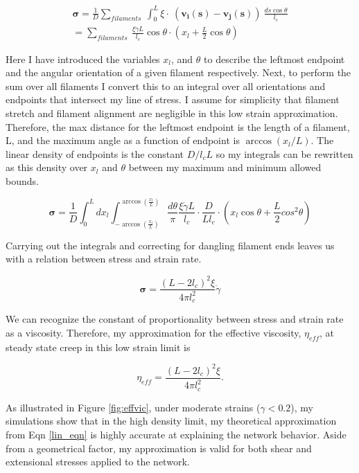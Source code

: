 \begin{multline}
\mathbf{\sigma} =  \frac{1}{D}\sum_{filaments}\:  \int_0^L \xi \cdot  \: (\mathbf{v_i(s)}-\mathbf{v_j(s)}) \:\frac{ds \cos \theta }{l_c} \\
 = \sum_{filaments}\:  \frac{\xi \dot \gamma L}{l_c} \cos \theta \cdot (x_l + \frac{L}{2} \cos \theta)
\end{multline}

Here I have introduced the variables $x_l$, and $\theta$ to describe the leftmost endpoint and the angular orientation of a given filament respectively.  Next, to perform the sum over all filaments I convert this to an integral over all orientations and endpoints that intersect my line of stress. I assume for simplicity that filament stretch and filament alignment are negligible in this low strain approximation.  Therefore, the max distance for the leftmost endpoint is the length of a filament, L, and the maximum angle as a function of endpoint is $\arccos(x_l/L)$.  The linear density of endpoints is the constant $D/l_cL$ so my integrals can be rewritten as this density over $x_l$ and $\theta$ between my maximum and minimum allowed bounds.

\begin{equation}
\mathbf{\sigma} =  \frac{1}{D} \int_0^L dx_l \int_{-\arccos (\frac{x_l}{L})}^{\arccos (\frac{x_l}{L})}\frac{d\theta}{\pi} \frac{\xi \dot \gamma L}{l_c} \cdot \frac{D}{Ll_c}\cdot (x_l \cos \theta + \frac{L}{2} cos^2\theta)
\end{equation}

Carrying out the integrals and correcting for dangling filament ends leaves us with a relation between stress and strain rate.

\begin{equation}
\mathbf{\sigma} = \frac{(L-2l_c)^2 \xi}{4\pi l_c^2} \dot \gamma 
\end{equation}

We can recognize the constant of proportionality between stress and strain rate as a viscosity.  Therefore, my approximation for the effective viscosity, $\eta_{eff}$, at steady state creep in this low strain limit is

\begin{equation}
\label{lin_eqn}
\eta_{eff} = \frac{(L-2l_c)^2 \xi}{4\pi l_c^2} .
\end{equation}

As illustrated in Figure \ref{fig:effvic}, under moderate strains ($\gamma<0.2$), my  simulations show that in the high density limit, my theoretical approximation from Eqn \ref{lin_eqn} is highly accurate at explaining the network behavior.  Aside from a geometrical factor, my approximation is valid for both shear and extensional stresses applied to the network.

